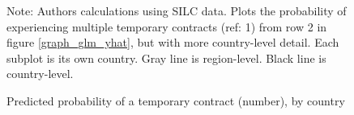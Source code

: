 \begin{figure}[htp!]
    \caption{Predicted probability of a temporary contract (number), by country}
    \label{graph_eu_silc_glm_yhat_num_country}
    \footnotesize{Note: Authors calculations using SILC data.  Plots the probability of experiencing multiple temporary contracts (ref: 1) from row 2 in figure \ref{graph_glm_yhat}, but with more country-level detail.  Each subplot is its own country.  Gray line is region-level.  Black line is country-level.}
\end{figure}

